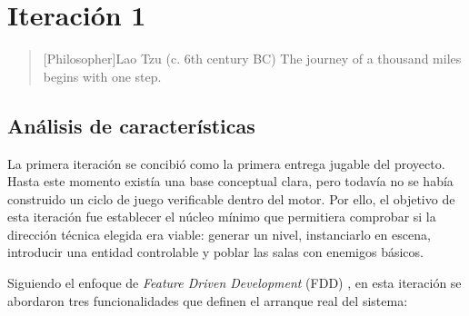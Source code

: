 \chapter{Iteración 1}

\begin{quotation}[Philosopher]{Lao Tzu (c. 6th century BC)}
The journey of a thousand miles begins with one step.
\end{quotation}

\begin{abstract}
Esta iteración abre la parte de ejecución, seguimiento y control de la memoria. A partir
de este punto, el desarrollo se documenta mediante iteraciones cerradas que recogen las
funcionalidades trabajadas, las decisiones de diseño, la implementación realizada y su
validación posterior. En concreto, esta primera iteración establece la base jugable
mínima del proyecto mediante la generación procedural del mapa, la incorporación del
jugador y la activación inicial de enemigos dentro de las salas.
\end{abstract}

\section{Análisis de características}
La primera iteración se concibió como la primera entrega jugable del proyecto. Hasta este
momento existía una base conceptual clara, pero todavía no se había construido un ciclo de
juego verificable dentro del motor. Por ello, el objetivo de esta iteración fue establecer
el núcleo mínimo que permitiera comprobar si la dirección técnica elegida era viable:
generar un nivel, instanciarlo en escena, introducir una entidad controlable y poblar las
salas con enemigos básicos.

Siguiendo el enfoque de \textit{Feature Driven Development} (FDD) \cite{palmer2002fdd}, en esta iteración se
abordaron tres funcionalidades que definen el arranque real del sistema:

